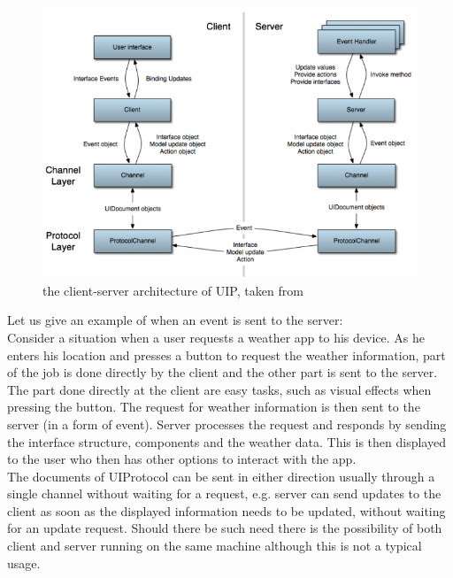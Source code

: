 \begin{figure}[ht!]
\centering
\includegraphics[width=135mm]{pics/UIParchitecture.png}
\caption{the client-server architecture of UIP, taken from \cite{uip}}

\label{fig:UIParchitecture}
\end{figure}
\pagebreak

Let us give an example of when an event is sent to the server:\\
Consider a situation when a user requests a weather app to his device. As he enters his location and presses a button to request the weather information, part of the job is done directly by the client and the other part is sent to the server. The part done directly at the client are easy tasks, such as visual effects when pressing the button. The request for weather information is then sent to the server (in a form of event). Server processes the request and responds by sending the interface structure, components and the weather data. This is then displayed to the user who then has other options to interact with the app.\\
The documents of UIProtocol can be sent in either direction usually through a single channel without waiting for a request, e.g. server can send updates to the client as soon as the displayed information needs to be updated, without waiting for an update request. Should there be such need there is the possibility of both client and server running on the same machine although this is not a typical usage.

